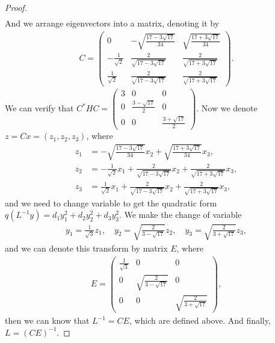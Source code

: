 \documentclass[10pt]{book}
\theoremstyle{definition}
\numberwithin{equation}{chapter}
\begin{document}
\begin{proof}
\begin{align*}
\end{align*}
And we arrange eigenvectors into a matrix, denoting it by 
\begin{align*}
    C = \left(\begin{matrix}
    0 & -\sqrt{\frac{17-3\sqrt{17}}{34}} & \sqrt{\frac{17+3\sqrt{17}}{34}} \\
    - \frac{1}{\sqrt{2}} & \frac{2}{\sqrt{17-3\sqrt{17}}} & \frac{2}{\sqrt{17+3\sqrt{17}}} \\
    \frac{1}{\sqrt{2}} & \frac{2}{\sqrt{17-3\sqrt{17}}} & \frac{2}{\sqrt{17+3\sqrt{17}}}
    \end{matrix}\right).
\end{align*}
We can verify that $C^*HC = \left(
\begin{matrix}
3 & 0 & 0\\
0 & \frac{3-\sqrt{17}}{2} & 0\\
0 & 0 & \frac{3+\sqrt{17}}{2}
\end{matrix}
\right)$. Now we denote $z = Cx = (z_1, z_2, z_3)$, where 
\begin{align*}
    z_1 & = -\sqrt{\frac{17-3\sqrt{17}}{34}}x_2 + \sqrt{\frac{17+3\sqrt{17}}{34}}x_3,\\
    z_2 & = - \frac{1}{\sqrt{2}}x_1 + \frac{2}{\sqrt{17-3\sqrt{17}}}x_2 + \frac{2}{\sqrt{17+3\sqrt{17}}}x_3, \\
    z_3 & = \frac{1}{\sqrt{2}}x_1 + \frac{2}{\sqrt{17-3\sqrt{17}}}x_2 + \frac{2}{\sqrt{17+3\sqrt{17}}}x_3,
\end{align*}
and we need to change variable to get the quadratic form $q\left(  L^{-1}y\right)  =d_{1}y_{1}^{2}+d_{2}y_{2}^{2}+d_{3}y_{3}^{2}$. We make the change of variable
\begin{align*}
    y_1 = \frac{1}{\sqrt{3}}z_1,\quad y_2 = \sqrt{\frac{2}{3-\sqrt{17}}} z_2,\quad y_3  = \sqrt{\frac{2}{3+\sqrt{17}}} z_3,
\end{align*}
and we can denote this transform by matrix $E$, where 
\begin{align*}
    E = \left(
    \begin{matrix}
    \frac{1}{\sqrt{3}} & 0 & 0\\
    0 & \sqrt{\frac{2}{3-\sqrt{17}}} & 0\\
    0 & 0 & \sqrt{\frac{2}{3+\sqrt{17}}}
    \end{matrix}
    \right),
\end{align*}
then we can know that $L^{-1} = CE$, which are defined above. And finally, $L = (CE)^{-1}$.
\end{proof}
\end{document}
